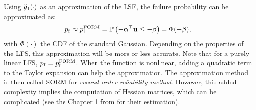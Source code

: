 Using $\check{g}_1(\cdot)$ as an approximation of the LSF, the failure probability can be approximated as: 
\begin{equation}
    p_\mathrm{f} \approx p_\mathrm{f}^{\mathrm{FORM}} = \mathbb{P}\left(- {\boldsymbol{\alpha}}^\top {\bf u} \leq -\beta\right) = \Phi(-\beta),
\end{equation} 
with $\Phi(\cdot)$ the CDF of the standard Gaussian. 
Depending on the properties of the LFS, this approximation will be more or less accurate. 
Note that for a purely linear LFS, $p_\mathrm{f} = p_\mathrm{f}^{\mathrm{FORM}}$. 
When the function is nonlinear, adding a quadratic term to the Taylor expansion can help the approximation. 
The approximation method is then called SORM for \textit{second order reliability method}. 
However, this added complexity implies the computation of Hessian matrices, which can be complicated (see the Chapter 1 from \citet{bourinet_2018} for their estimation).


